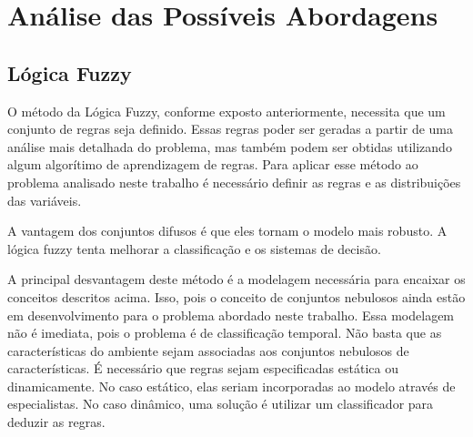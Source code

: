 \chapter{Análise das Possíveis Abordagens}\label{cap:anal_abordagens}



\section{Lógica Fuzzy}

O método da Lógica Fuzzy, conforme exposto anteriormente, necessita que um conjunto
de regras seja definido. Essas regras poder ser geradas a partir de uma análise mais
detalhada do problema, mas também podem ser obtidas utilizando algum algorítimo de
aprendizagem de regras. Para aplicar esse método ao problema analisado neste trabalho
é necessário definir as regras e as distribuições das variáveis.

A vantagem dos conjuntos difusos é que eles tornam o modelo mais robusto. A lógica fuzzy
tenta melhorar a classificação e os sistemas de decisão.

A principal desvantagem deste método é a modelagem necessária para encaixar os conceitos
descritos acima. Isso, pois o conceito de conjuntos nebulosos ainda estão em desenvolvimento
para o problema abordado neste trabalho. Essa modelagem não é imediata, pois o problema é de
classificação temporal. Não basta que as características do ambiente sejam associadas aos
conjuntos nebulosos de características. É necessário que regras sejam especificadas estática
ou dinamicamente. No caso estático, elas seriam incorporadas ao modelo através de especialistas.
No caso dinâmico, uma solução é utilizar um classificador para deduzir as regras.



